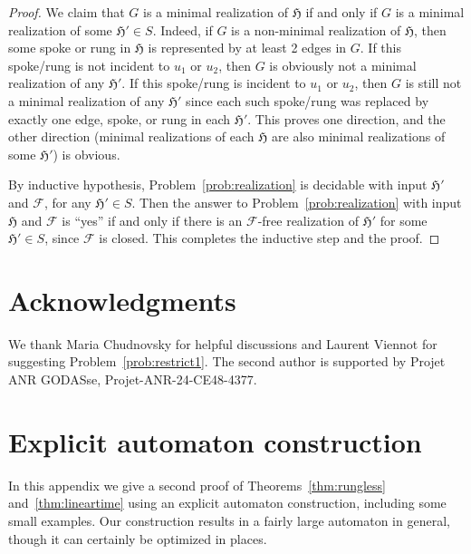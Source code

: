 \documentclass{article}
\newcommand{\Fc}{\mathcal{F}}
\newcommand{\Hf}{\mathfrak{H}}
\begin{document}
\begin{proof}
We claim that $G$ is a minimal realization of $\Hf$ if and only if $G$ is a minimal realization of some $\Hf'\in S$. Indeed, if $G$ is a non-minimal realization of $\Hf$, then some spoke or rung in $\Hf$ is represented by at least 2 edges in $G$. If this spoke/rung is not incident to $u_1$ or $u_2$, then $G$ is obviously not a minimal realization of any $\Hf'$. If this spoke/rung is incident to $u_1$ or $u_2$, then $G$ is still not a minimal realization of any $\Hf'$ since each such spoke/rung was replaced by exactly one edge, spoke, or rung in each $\Hf'$. This proves one direction, and the other direction (minimal realizations of each $\Hf$ are also minimal realizations of some $\Hf'$) is obvious.

By inductive hypothesis, Problem~\ref{prob:realization} is decidable with input $\Hf'$ and $\Fc$, for any $\Hf'\in S$. Then the answer to Problem~\ref{prob:realization} with input $\Hf$ and $\Fc$ is ``yes'' if and only if there is an $\Fc$-free realization of $\Hf'$ for some $\Hf'\in S$, since $\Fc$ is closed. This completes the inductive step and the proof.
\end{proof}

\section{Acknowledgments}

We thank Maria Chudnovsky for helpful discussions and Laurent Viennot for suggesting Problem~\ref{prob:restrict1}. The second author is supported by Projet ANR GODASse, Projet-ANR-24-CE48-4377.

\printbibliography

\appendix

\section{Explicit automaton construction}
\label{app:explicit}

In this appendix we give a second proof of Theorems~\ref{thm:rungless} and~\ref{thm:lineartime} using an explicit automaton construction, including some small examples. Our construction results in a fairly large automaton in general, though it can certainly be optimized in places.
\end{document}
